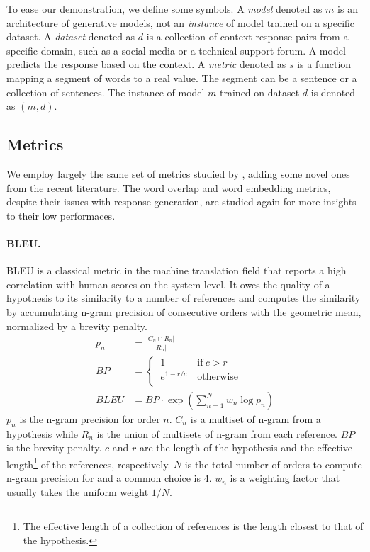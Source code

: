 \documentclass[runningheads]{llncs}
\begin{document}
    To ease our demonstration, we define some symbols. A \emph{model} denoted as $m$ is an architecture of generative models, not an \emph{instance} of model trained on a specific dataset. A \emph{dataset} denoted as $d$ is a collection of context-response pairs from a specific domain, such as a social media or a technical support forum. A model predicts the response based on the context. A \emph{metric} denoted as $s$ is a function mapping a segment of words to a real value. The segment can be a sentence or a collection of sentences. The instance of model $m$ trained on dataset $d$ is denoted as $(m, d)$.

    \subsection{Metrics}
    We employ largely the same set of metrics studied by \cite{HowNot}, adding some novel ones from the recent literature. The word overlap and word embedding metrics, despite their issues with response generation, are studied again for more insights to their low performaces.

    \paragraph{BLEU.}
    BLEU \cite{BLEU} is a classical metric in the machine translation field that reports a high correlation with human scores on the system level. It owes the quality of a hypothesis to its similarity to a number of references and computes the similarity by accumulating n-gram precision of consecutive orders with the geometric mean, normalized by a brevity penalty.
    \begin{align}
        p_n &= \frac{ |C_n \cap R_n| }{ |R_n| } \\
        \textit{BP} &=
        \begin{cases}
            \ 1 \ & \text{if} \  c > r \\
            \ e^{1 - r/c} \ & \text{otherwise} \\
        \end{cases} \\
        \textit{BLEU} &=
        \textit{BP} \cdot \exp \left( \sum_{n=1}^N w_n \log p_n \right)
    \end{align}
    $p_n$ is the n-gram precision for order $n$. $C_n$ is a multiset of n-gram from a hypothesis while $R_n$ is the union of multisets of n-gram from each reference. $\textit{BP}$ is the brevity penalty. $c$ and $r$ are the length of the hypothesis and the effective length\footnote{The effective length of a collection of references is the length closest to that of the hypothesis.} of the references, respectively. $N$ is the total number of orders to compute n-gram precision for and a common choice is 4. $w_n$ is a weighting factor that usually takes the uniform weight $1 / N$.
\end{document}

